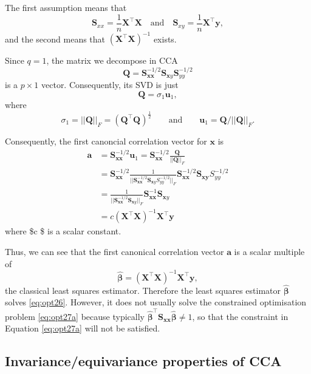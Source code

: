 \documentclass[]{book}
\theoremstyle{definition}
\theoremstyle{definition}
\theoremstyle{definition}
\theoremstyle{remark}
\begin{document}
The first assumption means that
\[\mathbf S_{xx}=\frac{1}{n}\mathbf X^\top \mathbf X\quad \mbox{and}\quad \mathbf S_{xy}=\frac{1}{n}\mathbf X^\top \mathbf y,\] and the second means that \((\mathbf X^\top \mathbf X)^{-1}\) exists.

Since \(q=1\), the matrix we decompose in CCA
\[
\mathbf Q=\mathbf S_{\mathbf x\mathbf x}^{-1/2} \mathbf S_{\mathbf xy}\mathbf S_{yy}^{-1/2}
\]
is a \(p \times 1\) vector. Consequently, its
SVD is just
\[
\mathbf Q=\sigma_1 \mathbf u_1,
\]
where
\[
\sigma_1=\vert \vert \mathbf Q\vert \vert_F = (\mathbf Q^\top \mathbf Q)^{\frac{1}{2}} \qquad \text{and} \qquad \mathbf u_1=\mathbf Q/\vert \vert \mathbf Q\vert \vert_F.
\]

Consequently, the first canoncial correlation vector for \(\mathbf x\) is
\begin{align*}
\mathbf a&=\mathbf S_{\mathbf x\mathbf x}^{-1/2}\mathbf u_1 =\mathbf S_{\mathbf x\mathbf x}^{-1/2} \frac{\mathbf Q}{||\mathbf Q||_F}\\
&=\mathbf S_{\mathbf x\mathbf x}^{-1/2} \frac{1}{\vert \vert \mathbf S_{\mathbf x\mathbf x}^{-1/2}\mathbf S_{\mathbf xy}S_{yy}^{-1/2}\vert \vert_F}\mathbf S_{\mathbf x\mathbf x}^{-1/2}\mathbf S_{\mathbf x\mathbf y}S_{yy}^{-1/2}\\
&=\frac{1}{\vert \vert \mathbf S_{\mathbf x\mathbf x}^{-1/2}\mathbf S_{\mathbf xy}\vert \vert_F}\mathbf S_{\mathbf x\mathbf x}^{-1}\mathbf S_{\mathbf xy}\\
&= c (\mathbf X^\top \mathbf X)^{-1}\mathbf X^\top \mathbf y
\end{align*}
where \$c \$ is a scalar constant.

Thus, we can see that the first canonical correlation vector \(\mathbf a\) is a scalar multiple of
\[
\hat{\pmb \beta}=\left ( \mathbf X^\top \mathbf X\right )^{-1} \mathbf X^\top \mathbf y,
\]
the classical least squares estimator. Therefore the least squares estimator \(\hat{\pmb \beta}\) solves \eqref{eq:opt26}. However, it does not usually solve the constrained optimisation problem \eqref{eq:opt27a} because typically \(\hat{\pmb \beta}^\top \mathbf S_{\mathbf x\mathbf x}\hat{\pmb \beta} \not= 1\), so that the constraint in Equation \eqref{eq:opt27a} will not be satisfied.

\hypertarget{invarianceequivariance-properties-of-cca}{%
\subsection{Invariance/equivariance properties of CCA}\label{invarianceequivariance-properties-of-cca}}
\end{document}
